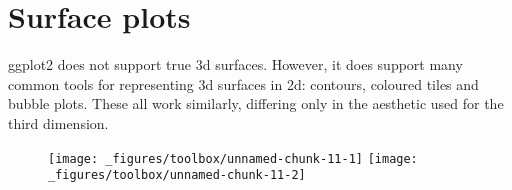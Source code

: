 \begin{enumerate}
\begin{Shaded}
\begin{Highlighting}[]
\StringTok{ }\OperatorTok{::}\OperatorTok{==}\NormalTok{)}
\OperatorTok{+}\StringTok{ }
\StringTok{  }\NormalTok{()}
\end{Highlighting}
\end{Shaded}
\end{enumerate}

\hypertarget{sec:surface}{%
\section{Surface plots}\label{sec:surface}}

ggplot2 does not support true 3d surfaces. However, it does support many
common tools for representing 3d surfaces in 2d: contours, coloured
tiles and bubble plots. These all work similarly, differing only in the
aesthetic used for the third dimension. 
  

\begin{Shaded}
\begin{Highlighting}[]
\OperatorTok{+}\StringTok{ }
\StringTok{  }\NormalTok{(}\NormalTok{(}

\OperatorTok{+}\StringTok{ }
\StringTok{  }\NormalTok{(}\NormalTok{(}
\end{Highlighting}
\end{Shaded}

\begin{figure}[H]
  \texttt{[image: \_figures/toolbox/unnamed-chunk-11-1]}%
  \texttt{[image: \_figures/toolbox/unnamed-chunk-11-2]}
\end{figure}

